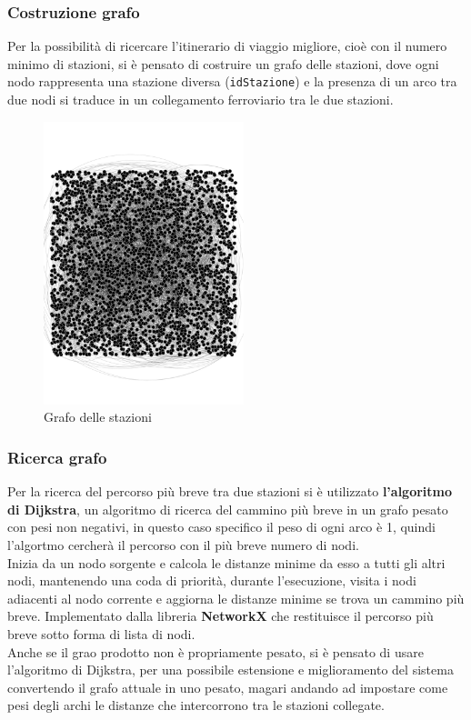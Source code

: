 \documentclass[italian,12pt,a4paper]{article}
\begin{document}
\subsubsection{Costruzione grafo}
	Per la possibilità di ricercare l'itinerario di viaggio migliore, cioè con il numero minimo di stazioni, si è pensato di costruire un grafo delle stazioni, dove ogni nodo rappresenta una stazione diversa (\texttt{idStazione}) e la presenza di un arco tra due nodi si traduce in un collegamento ferroviario tra le due stazioni.
	\\
	\begin{figure}[t]
		\centering
		\includegraphics[width=220px]{img/stations}
		\caption{Grafo delle stazioni}
		\label{fig:stationsgraph}
	\end{figure}
	
\subsubsection{Ricerca grafo}
	
		Per la ricerca del percorso più breve tra due stazioni si è utilizzato \textbf{l'algoritmo di Dijkstra}, un algoritmo di ricerca del cammino più breve in un grafo pesato con pesi non negativi, in questo caso specifico il peso di ogni arco è 1, quindi l'algortmo cercherà il percorso con il più breve numero di nodi.\\
		Inizia da un nodo sorgente e calcola le distanze minime da esso a tutti gli altri nodi, mantenendo una coda di priorità, durante l'esecuzione, visita i nodi adiacenti al nodo corrente e aggiorna le distanze minime se trova un cammino più breve. Implementato dalla libreria \textbf{NetworkX} che restituisce il percorso più breve sotto forma di lista di nodi. \\
		\linebreak
		Anche se il grao prodotto non è propriamente pesato, si è pensato di usare l'algoritmo di Dijkstra, per una possibile estensione e miglioramento del sistema convertendo il grafo attuale in uno pesato, magari andando ad impostare come pesi degli archi le distanze che intercorrono tra le stazioni collegate.
		
\end{document}
